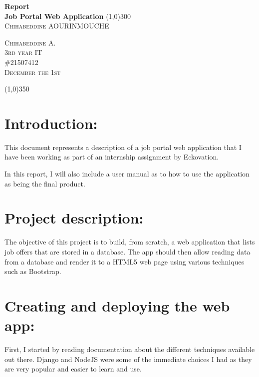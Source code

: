 \documentclass[french]{article}
\begin{document}
	\begin{titlepage}
		\begin{center}
			\huge{\bfseries Report\\Job Portal Web Application}
			\line(1,0){300}\\
			\vspace{0.25in}
			\textsc{\LARGE Chihabeddine AOURINMOUCHE\\}
			\vspace{12cm}
		\end{center}
		\begin{flushright}
			\textsc{\LARGE Chihabeddine A.\\
			3rd year IT\\
			\#21507412\\
			December the 1st\\}
		\end{flushright}
	\end{titlepage}
	
	\tableofcontents
	\vspace{0.25cm}
	
	\begin{center}
		\line(1,0){350}
	\end{center}
	
	\section{Introduction:}
		This document represents a description of a job portal web application that I have been working as part of an internship assignment by Eckovation.
		
		In this report, I will also include a user manual as to how to use the application as being the final product.
		
	\section{Project description:}
		The objective of this project is to build, from scratch, a web application that lists job offers that are stored in a database. The app should then allow reading data from a database and render it to a HTML5 web page using various techniques such as Bootstrap.
		
	\section{Creating and deploying the web app:}
		First, I started by reading documentation about the different techniques available out there. Django and NodeJS were some of the immediate choices I had as they are very popular and easier to learn and use.
		
\end{document}

